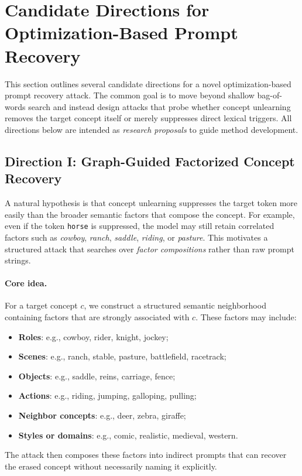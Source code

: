 \section{Candidate Directions for Optimization-Based Prompt Recovery}
\label{sec:candidate_attack_directions}

This section outlines several candidate directions for a novel optimization-based prompt recovery attack. The common goal is to move beyond shallow bag-of-words search and instead design attacks that probe whether concept unlearning removes the target concept itself or merely suppresses direct lexical triggers. All directions below are intended as \emph{research proposals} to guide method development.

\subsection{Direction I: Graph-Guided Factorized Concept Recovery}
\label{subsec:graph_guided_recovery}

A natural hypothesis is that concept unlearning suppresses the target token more easily than the broader semantic factors that compose the concept. For example, even if the token \texttt{horse} is suppressed, the model may still retain correlated factors such as \emph{cowboy}, \emph{ranch}, \emph{saddle}, \emph{riding}, or \emph{pasture}. This motivates a structured attack that searches over \emph{factor compositions} rather than raw prompt strings.

\paragraph{Core idea.}
For a target concept $c$, we construct a structured semantic neighborhood containing factors that are strongly associated with $c$. These factors may include:
\begin{itemize}
    \item \textbf{Roles}: e.g., cowboy, rider, knight, jockey;
    \item \textbf{Scenes}: e.g., ranch, stable, pasture, battlefield, racetrack;
    \item \textbf{Objects}: e.g., saddle, reins, carriage, fence;
    \item \textbf{Actions}: e.g., riding, jumping, galloping, pulling;
    \item \textbf{Neighbor concepts}: e.g., deer, zebra, giraffe;
    \item \textbf{Styles or domains}: e.g., comic, realistic, medieval, western.
\end{itemize}
The attack then composes these factors into indirect prompts that can recover the erased concept without necessarily naming it explicitly.

